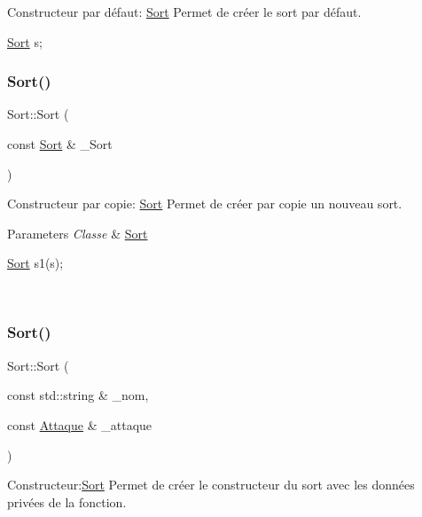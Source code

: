 Constructeur par défaut\+: \hyperlink{classSort}{Sort} Permet de créer le sort par défaut. 


\begin{DoxyCode}
\hyperlink{classSort}{Sort} s;
\end{DoxyCode}
 \mbox{\label{classSort_a0b765452defe7f6f0c6fe4dbec471e7c}} 
\subsubsection{\texorpdfstring{Sort()}{Sort()}\hspace{0.1cm}{\footnotesize\ttfamily [2/3]}}
{\footnotesize\ttfamily Sort\+::\+Sort (\begin{DoxyParamCaption}\item[{const \hyperlink{classSort}{Sort} \&}]{\+\_\+\+Sort }\end{DoxyParamCaption})}



Constructeur par copie\+: \hyperlink{classSort}{Sort} Permet de créer par copie un nouveau sort. 


\begin{DoxyParams}{Parameters}
{\em Classe} & \hyperlink{classSort}{Sort} 
\begin{DoxyCode}
\hyperlink{classSort}{Sort} s1(s);
\end{DoxyCode}
 \\
\hline
\end{DoxyParams}
\mbox{\label{classSort_ac50c836a5f2a6a74665a898d4af24e0a}} 
\subsubsection{\texorpdfstring{Sort()}{Sort()}\hspace{0.1cm}{\footnotesize\ttfamily [3/3]}}
{\footnotesize\ttfamily Sort\+::\+Sort (\begin{DoxyParamCaption}\item[{const std\+::string \&}]{\+\_\+nom,  }\item[{const \hyperlink{classAttaque}{Attaque} \&}]{\+\_\+attaque }\end{DoxyParamCaption})}



Constructeur\+:\hyperlink{classSort}{Sort} Permet de créer le constructeur du sort avec les données privées de la fonction. 


